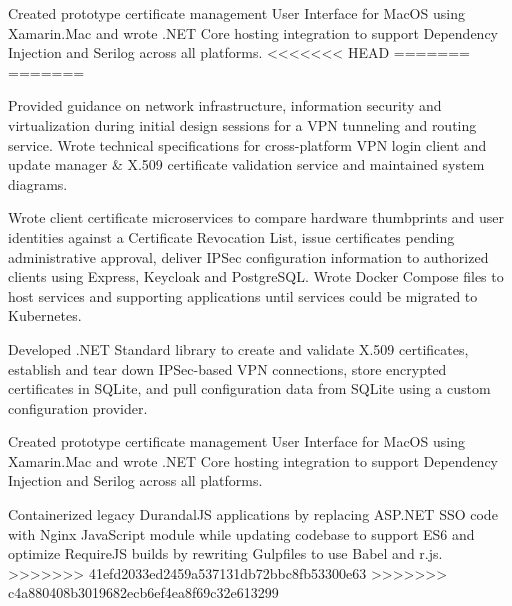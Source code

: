 \begin{cventries}
{\begin{cvitems}
        \item {Created prototype certificate management User Interface for MacOS using Xamarin.Mac and wrote .NET Core hosting integration to support Dependency Injection and Serilog across all platforms.}
<<<<<<< HEAD
=======
=======
        \item {Provided guidance on network infrastructure, information security and virtualization during initial design sessions for a VPN tunneling and routing service. Wrote technical specifications for cross-platform VPN login client and update manager \& X.509 certificate validation service and maintained system diagrams.}
        \item {Wrote client certificate microservices to compare hardware thumbprints and user identities against a Certificate Revocation List, issue certificates pending administrative approval, deliver IPSec configuration information to authorized clients using Express, Keycloak and PostgreSQL. Wrote Docker Compose files to host services and supporting applications until services could be migrated to Kubernetes.}
        \item {Developed .NET Standard library to create and validate X.509 certificates, establish and tear down IPSec-based VPN connections, store encrypted certificates in SQLite, and pull configuration data from SQLite using a custom configuration provider.}
        \item {Created prototype certificate management User Interface for MacOS using Xamarin.Mac and wrote .NET Core hosting integration to support Dependency Injection and Serilog across all platforms.}
        \item {Containerized legacy DurandalJS applications by replacing ASP.NET SSO code with Nginx JavaScript module while updating codebase to support ES6 and optimize RequireJS builds by rewriting Gulpfiles to use Babel and r.js.}
>>>>>>> 41efd2033ed2459a537131db72bbc8fb53300e63
>>>>>>> c4a880408b3019682ecb6ef4ea8f69c32e613299
      \end{cvitems}
    }


\end{cventries}
